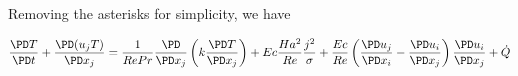 \documentclass[11pt]{article}
\begin{document}
Removing the asterisks for simplicity, we have

\begin{equation}
	\frac{\PD T}{\PD t} +
	\frac{\PD (u_j T)}{\PD x_j}
	=
	\frac{1}{Re Pr}
	\frac{\PD}{\PD x_j}
	\left( k \frac{\PD T}{\PD x_j} \right) +
	Ec \frac{Ha^2}{Re}
	\frac{{j}^2}{\sigma} +
	\frac{Ec}{Re}
	\left( \frac{\PD u_j}{\PD x_i} - \frac{\PD u_i}{\PD x_j} \right)
	\frac{\PD u_i}{\PD x_j} +
	\dot{Q}
\end{equation}
\end{document}
